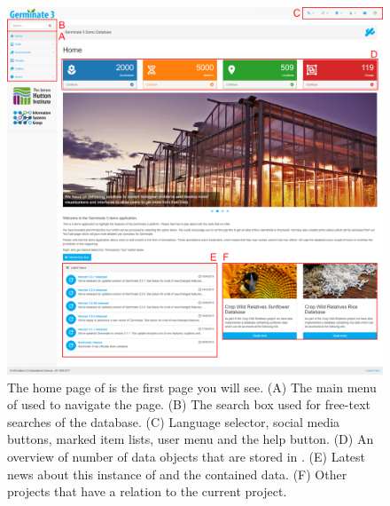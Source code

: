 \begin{figure}
	\centering
	\includegraphics[width=0.85\linewidth]{img/overview/home.png}
	\caption{The home page of {\germinate} is the first page you will see. (A) The main menu of {\germinate} used to navigate the page. (B) The search box used for free-text searches of the database. (C) Language selector, social media buttons, marked item lists, user menu and the help button. (D) An overview of number of data objects that are stored in {\germinate}. (E) Latest news about this instance of {\germinate} and the contained data. (F) Other projects that have a relation to the current project.}
	\label{fig:overview:home}
\end{figure}